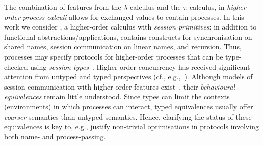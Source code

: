 \noindent
{}
The combination of features from the $\lambda$-calculus and the $\pi$-calculus,
in \emph{higher-order process calculi} allows for exchanged values to contain  processes.  
In this work we consider \HOp, a higher-order calculus with \emph{session primitives}:
in addition to 
functional
abstractions/applications, \HOp 
contains constructs for 
synchronisation on shared names, 
  session communication on linear names, 
  and recursion.
Thus, \HOp processes may specify %
protocols
for higher-order  processes that
 can be 
 type-checked 
 using \emph{session types}~\cite{honda.vasconcelos.kubo:language-primitives}.
Higher-order concurrency has received significant attention 
from untyped and typed perspectives (cf., e.g.,~\cite{SangiorgiD:expmpa,JeffreyR05,DBLP:journals/iandc/LanesePSS11,DBLP:journals/cl/KoutavasH12,MostrousY15}).
Although models of session 
communication with  higher-order features exist~\cite{tlca07,DBLP:journals/jfp/GayV10},
their  \emph{behavioural equivalences} 
remain little understood. 
Since types can limit the contexts (environments) in which processes can interact, typed equivalences
usually offer {\em coarser} semantics than untyped semantics.
Hence, clarifying the status of these equivalences is key to, e.g., 
justify non-trivial  optimisations in protocols involving both name- and process-passing.


